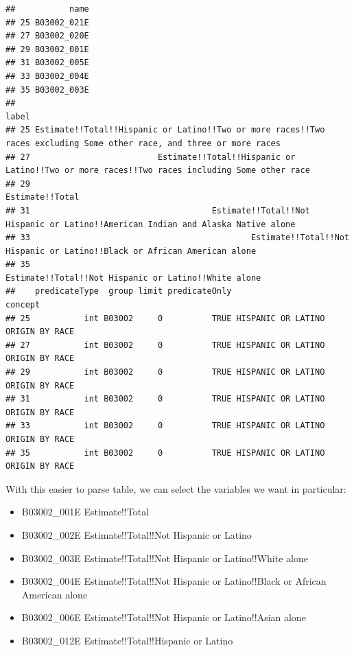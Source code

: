 \documentclass[openany]{book}
\providecommand{\tightlist}{%
  \setlength{\itemsep}{0pt}\setlength{\parskip}{0pt}}
\begin{document}
\begin{verbatim}
##           name
## 25 B03002_021E
## 27 B03002_020E
## 29 B03002_001E
## 31 B03002_005E
## 33 B03002_004E
## 35 B03002_003E
##                                                                                                                   label
## 25 Estimate!!Total!!Hispanic or Latino!!Two or more races!!Two races excluding Some other race, and three or more races
## 27                          Estimate!!Total!!Hispanic or Latino!!Two or more races!!Two races including Some other race
## 29                                                                                                      Estimate!!Total
## 31                                     Estimate!!Total!!Not Hispanic or Latino!!American Indian and Alaska Native alone
## 33                                             Estimate!!Total!!Not Hispanic or Latino!!Black or African American alone
## 35                                                                 Estimate!!Total!!Not Hispanic or Latino!!White alone
##    predicateType  group limit predicateOnly                           concept
## 25           int B03002     0          TRUE HISPANIC OR LATINO ORIGIN BY RACE
## 27           int B03002     0          TRUE HISPANIC OR LATINO ORIGIN BY RACE
## 29           int B03002     0          TRUE HISPANIC OR LATINO ORIGIN BY RACE
## 31           int B03002     0          TRUE HISPANIC OR LATINO ORIGIN BY RACE
## 33           int B03002     0          TRUE HISPANIC OR LATINO ORIGIN BY RACE
## 35           int B03002     0          TRUE HISPANIC OR LATINO ORIGIN BY RACE
\end{verbatim}

With this easier to parse table, we can select the variables we want in particular:

\begin{itemize}
\tightlist
\item
  B03002\_001E Estimate!!Total\\
\item
  B03002\_002E Estimate!!Total!!Not Hispanic or Latino
\item
  B03002\_003E Estimate!!Total!!Not Hispanic or Latino!!White alone
\item
  B03002\_004E Estimate!!Total!!Not Hispanic or Latino!!Black or African American alone
\item
  B03002\_006E Estimate!!Total!!Not Hispanic or Latino!!Asian alone
\item
  B03002\_012E Estimate!!Total!!Hispanic or Latino
\end{itemize}
\end{document}
